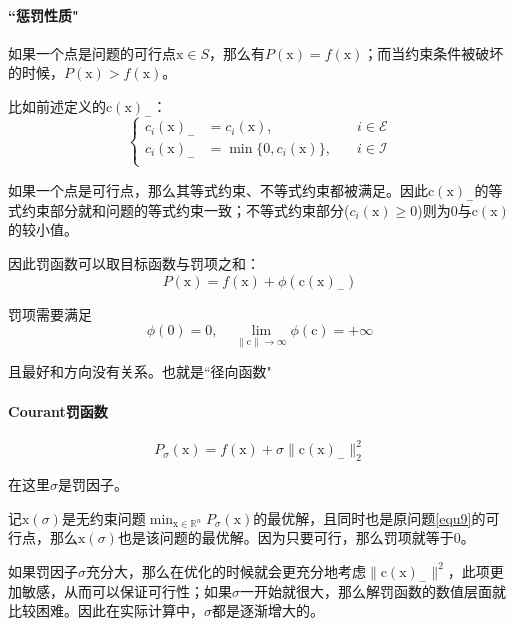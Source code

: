 \documentclass[a4paper]{D:/repositories/MyDGP/latex/PaperReadingLog}
\begin{document}
\paragraph{``惩罚性质"}
如果一个点是问题的可行点$\mathrm{x}\in S$，那么有$P(\mathrm{x})=f(\mathrm{x})$；而当约束条件被破坏的时候，$P(\mathrm{x})>f(\mathrm{x})$。

比如前述定义的$\mathrm{c}(\mathrm{x})_-$：
$$
\left\{
\begin{aligned}
    c_i(\mathrm{x})_-&=c_i(\mathrm{x}),\quad&i\in\mathcal{E}\\
    c_i(\mathrm{x})_-&=\min\{0,c_i(\mathrm{x})\},\quad&i\in\mathcal{I}\\
\end{aligned}    
\right.
$$

如果一个点是可行点，那么其等式约束、不等式约束都被满足。因此$\mathrm{c}(\mathrm{x})_-$的等式约束部分就和问题的等式约束一致；不等式约束部分($c_i(\mathrm{x})\ge 0$)则为0与$\mathrm{c}(\mathrm{x})$的较小值。

因此罚函数可以取目标函数与罚项之和：
$$
P(\mathrm{x})=f(\mathrm{x})+\phi(\mathrm{c}(\mathrm{x})_-)
$$

罚项需要满足
$$
\phi(0)=0,\quad\lim_{\lVert \mathrm{c}\lVert \rightarrow \infty}\phi(\mathrm{c})=+\infty
$$

且最好和方向没有关系。也就是``径向函数"

\paragraph{Courant罚函数}
    $$
    P_\sigma(\mathrm{x})=f(\mathrm{x})+\sigma\lVert \mathrm{c}(\mathrm{x})_-\lVert_2^2
    $$

    在这里$\sigma$是罚因子。

记$\mathrm{x}(\sigma)$是无约束问题$\min_{\mathrm{x}\in\mathbb{R}^n}P_{\sigma}(\mathrm{x})$的最优解，且同时也是原问题\ref{equ9}的可行点，那么$\mathrm{x}(\sigma)$也是该问题的最优解。因为只要可行，那么罚项就等于0。

如果罚因子$\sigma$充分大，那么在优化的时候就会更充分地考虑$\lVert \mathrm{c}(\mathrm{x})_-\lVert^2$，此项更加敏感，从而可以保证可行性；如果$\sigma$一开始就很大，那么解罚函数的数值层面就比较困难。因此在实际计算中，$\sigma$都是逐渐增大的。
\end{document}
